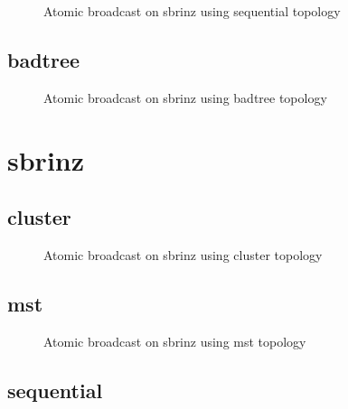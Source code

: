 \begin{figure}[h!]
\begin{tikzpicture}[transform shape,scale=.25]

\end{tikzpicture}

\caption{Atomic broadcast on sbrinz using sequential topology}
\label{fig:ab_sbrinz_sequential}
\end{figure}
\clearpage\subsection{badtree}

\begin{figure}[h!]
\begin{tikzpicture}[transform shape,scale=.25]

\end{tikzpicture}

\caption{Atomic broadcast on sbrinz using badtree topology}
\label{fig:ab_sbrinz_badtree}
\end{figure}
\clearpage\newpage\clearpage\section{sbrinz}

\subsection{cluster}

\begin{figure}[h!]
\begin{tikzpicture}[transform shape,scale=.25]

\end{tikzpicture}

\caption{Atomic broadcast on sbrinz using cluster topology}
\label{fig:ab_sbrinz_cluster}
\end{figure}
\clearpage\subsection{mst}

\begin{figure}[h!]
\begin{tikzpicture}[transform shape,scale=.25]

\end{tikzpicture}

\caption{Atomic broadcast on sbrinz using mst topology}
\label{fig:ab_sbrinz_mst}
\end{figure}
\clearpage\subsection{sequential}

